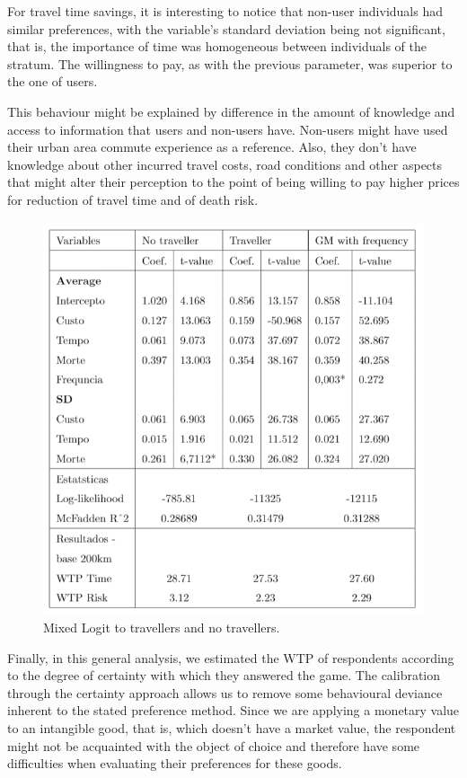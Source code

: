 \documentclass[]{elsarticle} %
\makeatletter
\def\maxwidth{\ifdim\Gin@nat@width>\linewidth\linewidth
\else\Gin@nat@width\fi}
\let\Oldincludegraphics\includegraphics
\renewcommand{\includegraphics}[1]{\Oldincludegraphics[width=\maxwidth]{#1}}
\makeatother
\begin{document}
For travel time savings, it is interesting to notice that non-user
individuals had similar preferences, with the variable's standard
deviation being not significant, that is, the importance of time was
homogeneous between individuals of the stratum. The willingness to pay,
as with the previous parameter, was superior to the one of users.

This behaviour might be explained by difference in the amount of
knowledge and access to information that users and non-users have.
Non-users might have used their urban area commute experience as a
reference. Also, they don't have knowledge about other incurred travel
costs, road conditions and other aspects that might alter their
perception to the point of being willing to pay higher prices for
reduction of travel time and of death risk.

\begin{figure}
\centering
\includegraphics{table15.png}
\caption{Mixed Logit to travellers and no travellers.}
\end{figure}

Finally, in this general analysis, we estimated the WTP of respondents
according to the degree of certainty with which they answered the game.
The calibration through the certainty approach allows us to remove some
behavioural deviance inherent to the stated preference method. Since we
are applying a monetary value to an intangible good, that is, which
doesn't have a market value, the respondent might not be acquainted with
the object of choice and therefore have some difficulties when
evaluating their preferences for these goods.
\end{document}
